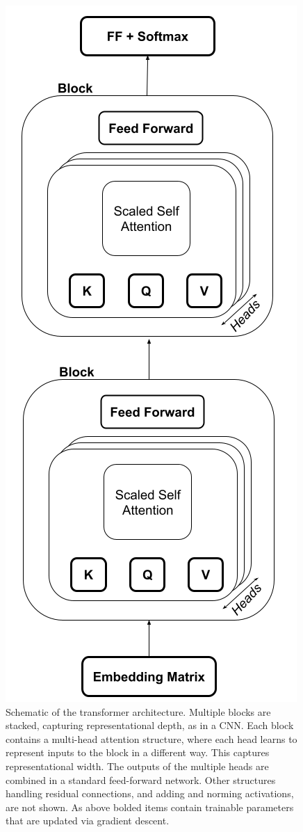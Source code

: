 \begin{figure}[h]
\centering
\includegraphics[scale=.35]{./images/transformerArchitectureSchematic.png}
\caption[Jeff Yoshimi with consultation from Tim Meyer.]{Schematic of the transformer architecture. Multiple blocks are stacked, capturing representational depth, as in a CNN. Each block contains a multi-head attention structure, where each head learns to represent inputs to the block in a different way. This captures representational width. The outputs of the multiple heads are combined in a standard feed-forward network. Other structures handling residual connections, and adding and norming activations, are not shown. As above bolded items contain trainable parameters that are updated via gradient descent.}
\label{transformerArchitectureSchematic}
\end{figure}
 
